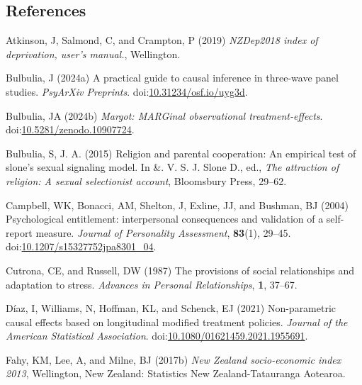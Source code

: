 \documentclass[
  single column]{article}
\newlength{\cslhangindent}
\newenvironment{CSLReferences}[2] %
 {\begin{list}{}{%
  \setlength{\itemindent}{0pt}
  \setlength{\leftmargin}{0pt}
  \setlength{\parsep}{0pt}
  \ifodd #1
   \setlength{\leftmargin}{\cslhangindent}
   \setlength{\itemindent}{-1\cslhangindent}
  \fi
  \setlength{\itemsep}{#2\baselineskip}}}
 {\end{list}}
\begin{document}
\subsection*{References}\label{references}

\label{refs}
\begin{CSLReferences}{1}{0}
Atkinson, J, Salmond, C, and Crampton, P (2019) \emph{NZDep2018 index of
deprivation, user{'}s manual.}, Wellington.

Bulbulia, J (2024a) A practical guide to causal inference in three-wave
panel studies. \emph{PsyArXiv Preprints}.
doi:\href{https://doi.org/10.31234/osf.io/uyg3d}{10.31234/osf.io/uyg3d}.

Bulbulia, JA (2024b) \emph{Margot: MARGinal observational
treatment-effects}.
doi:\href{https://doi.org/10.5281/zenodo.10907724}{10.5281/zenodo.10907724}.

Bulbulia, S, J. A. (2015) Religion and parental cooperation: An
empirical test of slone's sexual signaling model. In \&. V. S. J. Slone
D., ed., \emph{The attraction of religion: A sexual selectionist
account}, Bloomsbury Press, 29--62.

Campbell, WK, Bonacci, AM, Shelton, J, Exline, JJ, and Bushman, BJ
(2004) Psychological entitlement: interpersonal consequences and
validation of a self-report measure. \emph{Journal of Personality
Assessment}, \textbf{83}(1), 29--45.
doi:\href{https://doi.org/10.1207/s15327752jpa8301_04}{10.1207/s15327752jpa8301\_04}.

Cutrona, CE, and Russell, DW (1987) The provisions of social
relationships and adaptation to stress. \emph{Advances in Personal
Relationships}, \textbf{1}, 37--67.

Díaz, I, Williams, N, Hoffman, KL, and Schenck, EJ (2021) Non-parametric
causal effects based on longitudinal modified treatment policies.
\emph{Journal of the American Statistical Association}.
doi:\href{https://doi.org/10.1080/01621459.2021.1955691}{10.1080/01621459.2021.1955691}.

Fahy, KM, Lee, A, and Milne, BJ (2017b) \emph{New Zealand socio-economic
index 2013}, Wellington, New Zealand: Statistics New Zealand-Tatauranga
Aotearoa.


\end{CSLReferences}
\end{document}
